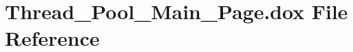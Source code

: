 \hypertarget{_thread___pool___main___page_8dox}{}\section{Thread\+\_\+\+Pool\+\_\+\+Main\+\_\+\+Page.\+dox File Reference}
\label{_thread___pool___main___page_8dox}
